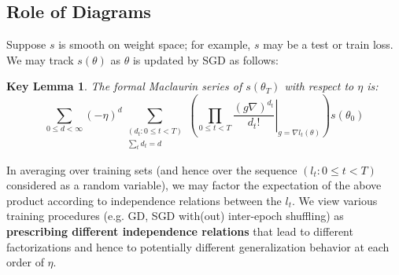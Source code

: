 \documentclass{article}
\newtheorem{klem}{Key Lemma}
\begin{document}
\subsection{Role of Diagrams}
    Suppose $s$ is smooth on weight space; for example, $s$ may be a test or
    train loss.  We may track $s(\theta)$ as $\theta$ is updated by SGD as
    follows:
    \begin{klem}
        The formal Maclaurin series of $s(\theta_T)$ with respect to $\eta$ is:
        \begin{equation*}\label{eq:dyson}
            \sum_{0\leq d < \infty} (-\eta)^d \sum_{\substack{(d_t: 0\leq t<T) \\ \sum_t d_t = d}}
            \left(
                \prod_{0 \leq t < T}
                    \left.  \frac{(g \nabla)^{d_t}}{d_t!} \right|_{g=\nabla l_t(\theta)}
            \right)
            s (\theta_0)
        \end{equation*}
    \end{klem}
    In averaging over training sets (and hence over the sequence $(l_t: 0\leq
    t<T)$ considered as a random variable), we may factor the expectation of
    the above product according to independence relations between the $l_t$.
    We view various training procedures (e.g. GD, SGD with(out) inter-epoch
    shuffling) as {\bf prescribing different independence relations} that lead
    to different factorizations and hence to potentially different
    generalization behavior at each order of $\eta$.
\end{document}
